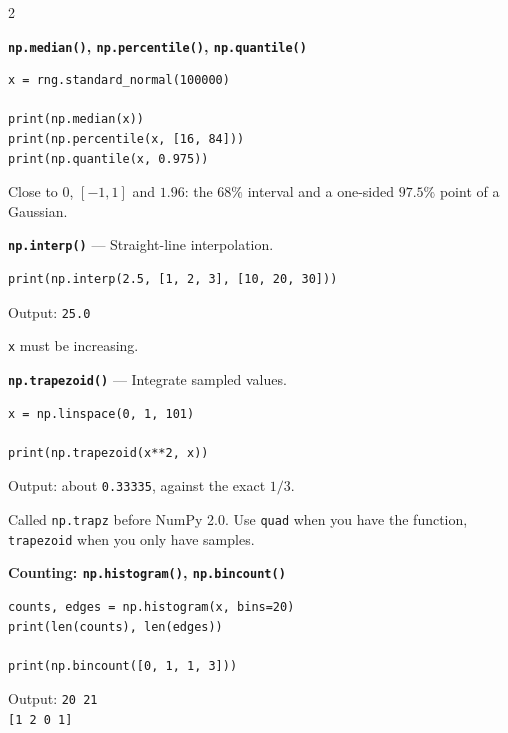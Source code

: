 \documentclass[10pt,a4paper]{article}
\begin{document}
\begin{multicols}{2}
\begin{card}
\textbf{\texttt{np.median()}, \texttt{np.percentile()}, \texttt{np.quantile()}}

\begin{lstlisting}[style=pythonstyle]
x = rng.standard_normal(100000)

print(np.median(x))
print(np.percentile(x, [16, 84]))
print(np.quantile(x, 0.975))
\end{lstlisting}

Close to $0$, $[-1, 1]$ and $1.96$: the $68\%$ interval and a one-sided
$97.5\%$ point of a Gaussian.
\end{card}

\begin{card}
\textbf{\texttt{np.interp()}} --- Straight-line interpolation.

\begin{lstlisting}[style=pythonstyle]
print(np.interp(2.5, [1, 2, 3], [10, 20, 30]))
\end{lstlisting}

Output: \texttt{25.0}

\texttt{x} must be increasing.
\end{card}

\begin{card}
\textbf{\texttt{np.trapezoid()}} --- Integrate sampled values.

\begin{lstlisting}[style=pythonstyle]
x = np.linspace(0, 1, 101)

print(np.trapezoid(x**2, x))
\end{lstlisting}

Output: about \texttt{0.33335}, against the exact $1/3$.

Called \texttt{np.trapz} before NumPy 2.0. Use \texttt{quad} when you
have the function, \texttt{trapezoid} when you only have samples.
\end{card}

\begin{card}
\textbf{Counting: \texttt{np.histogram()}, \texttt{np.bincount()}}

\begin{lstlisting}[style=pythonstyle]
counts, edges = np.histogram(x, bins=20)
print(len(counts), len(edges))

print(np.bincount([0, 1, 1, 3]))
\end{lstlisting}

Output:
\texttt{20 21}\\
\texttt{[1 2 0 1]}


\end{card}
\end{multicols}
\end{document}
